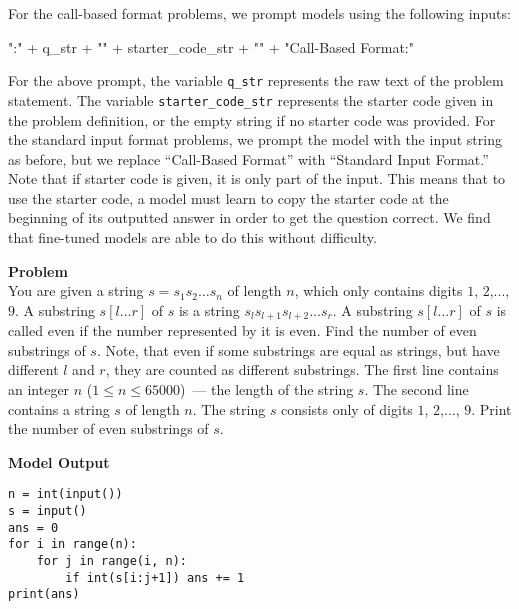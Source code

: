 \documentclass{article}
\begin{document}
For the call-based format problems, we prompt models using the following inputs:

\begin{spverbatim}
"\nQUESTION:\n" + q_str + "\n" + starter_code_str + "\n" + "\nUse Call-Based Format\n\nANSWER:\n"
\end{spverbatim}


For the above prompt, the variable \verb|q_str| represents the raw text of the problem statement. The variable \verb|starter_code_str| represents the starter code given in the problem definition, or the empty string if no starter code was provided. For the standard input format problems, we prompt the model with the input string as before, but we replace ``Call-Based Format'' with ``Standard Input Format.'' Note that if starter code is given, it is only part of the input. This means that to use the starter code, a model must learn to copy the starter code at the beginning of its outputted answer in order to get the question correct. We find that fine-tuned models are able to do this without difficulty.




















\begin{figure*}
    \textbf{Problem} \\
     You are given a string $s=s_1s_2\dots s_n$ of length $n$, which only contains digits $1$, $2$,..., $9$. A substring $s[l \dots r]$ of $s$ is a string $s_l s_{l + 1} s_{l + 2} \ldots s_r$. A substring $s[l \dots r]$ of $s$ is called even if the number represented by it is even. Find the number of even substrings of $s$. Note, that even if some substrings are equal as strings, but have different $l$ and $r$, they are counted as different substrings. The first line contains an integer $n$ ($1 \le n \le 65000$) — the length of the string $s$. The second line contains a string $s$ of length $n$. The string $s$ consists only of digits $1$, $2$,..., $9$. Print the number of even substrings of $s$.

 

 \textbf{Model Output}
 \begin{verbatim}
n = int(input())
s = input()
ans = 0
for i in range(n):
    for j in range(i, n):
        if int(s[i:j+1]) ans += 1
print(ans)
 \end{verbatim}

\caption{Model-generated code from GPT-2 1.5B. 18/18 test cases pass for the problem. Note that models were given in problems exactly as they they are formatted here, which even meant parsing \LaTeX. For brevity, we exclude formatting instructions from this depicted problem.}
    \label{fig:samples_from_1500}
\end{figure*}
\end{document}
